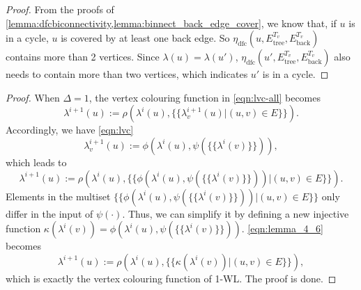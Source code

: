 \vertexinbiconnectedcomponent*

\begin{proof}

    From the proofs of \cref{lemma:dfcbiconnectivity,lemma:binnect_back_edge_cover}, we know that, if $u$ is in a cycle, $u$ is covered by at least one back edge. So $\eta_{\text{dfc}}(u,E_{\text{tree}}^{T_v},E_{\text{back}}^{T_v})$ contains more than 2 vertices. Since $\lambda(u)=\lambda(u')$, $\eta_{\text{dfc}}(u',E_{\text{tree}}^{T_v},E_{\text{back}}^{T_v})$ also needs to contain more than two vertices, which indicates $u'$ is in a cycle.
    
\end{proof}

\onewlequal*

\begin{proof}
When $\Delta=1$, the vertex colouring function in \cref{eqn:lvc-all} becomes
\begin{equation}
    \lambda^{i+1}(u):= \rho(\lambda^i(u), \{\!\!\{\lambda^{i+1}_v(u)| (u,v)\in E\}\!\!\}).
\end{equation}
Accordingly, we have \cref{eqn:lvc}
\begin{equation}
   \lambda^{i+1}_v(u):= \phi\left(\lambda^i(u), \psi(\{\!\!\{\lambda^{i}(v)\}\!\!\})\right),
\end{equation}
which leads to
\begin{equation}
\label{eqn:lemma_4_6}
    \lambda^{i+1}(u) := \rho\left(\lambda^i(u), \{\!\!\{\phi\left(\lambda^i(u), \psi\left(\{\!\!\{\lambda^{i}(v)\}\!\!\}\right)\right)|(u,v) \in E\}\!\!\}\right).
\end{equation}
Elements in the multiset $\{\!\!\{\phi\left(\lambda^i(u), \psi\left(\{\!\!\{\lambda^{i}(v)\}\!\!\}\right)\right)|(u,v) \in E\}\!\!\}$ only differ in the input of $\psi(\cdot)$. Thus, we can simplify it by defining a new injective function $\kappa(\lambda^i(v)) = \phi\left(\lambda^i(u), \psi\left(\{\!\!\{\lambda^{i}(v)\}\!\!\}\right)\right)$. \cref{eqn:lemma_4_6} becomes 
\begin{equation}
    \lambda^{i+1}(u) := \rho\left(\lambda^i(u), \{\!\!\{\kappa(\lambda^i(v))|(u,v) \in E\}\!\!\}\right),
\end{equation}
which is exactly the vertex colouring function of 1-WL. The proof is done.
\end{proof}


